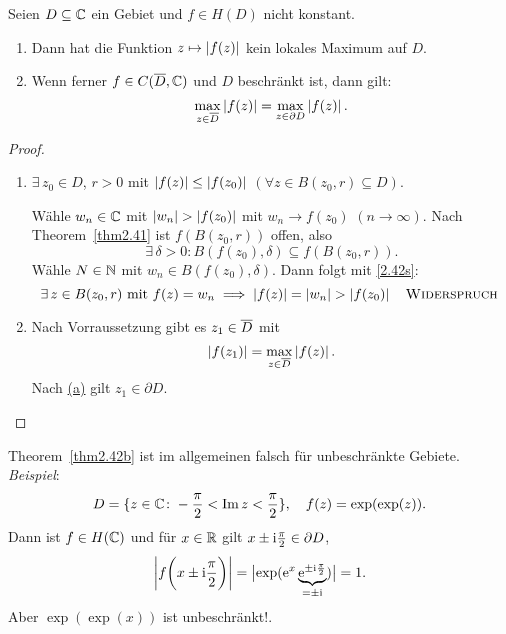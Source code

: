 \documentclass[a4paper,twoside,DIV15,BCOR12mm]{scrbook}
\begin{document}
\begin{thm}[Maximumsprinzip]\label{thm2.42}
Seien $D\subseteq\mathbb{C}$ ein Gebiet und $f\in H(D)$ nicht konstant.
\begin{enumerate}
\item\label{thm2.42a} Dann hat die Funktion $z\mapsto\left\lvert f(z)\right\lvert$ kein lokales Maximum auf $D$.
\item\label{thm2.42b} Wenn ferner $f\in C(\overline{D},\mathbb{C})$ und $D$ beschränkt ist, dann gilt:
\[\max_{z\in\overline{D}}\left\lvert f(z)\right\lvert=\max_{z\in\partial D}\left\lvert f(z)\right\lvert.\]
\end{enumerate}
\end{thm}

\begin{proof}\begin{enumerate}
\item \ann $\exists\, z_0\in D$, $r>0$ mit $\left\lvert f(z)\right\lvert\leq\left\lvert f(z_0)\right\lvert$ $(\forall z\in B(z_0,r)\subseteq D)$.

Wähle $w_n\in\mathbb{C}$ mit $\left\lvert w_n\right\lvert>\left\lvert f(z_0)\right\lvert$ mit $w_n\to f(z_0)$ $(n\to\infty)$. Nach Theorem~\ref{thm2.41} ist $f(B(z_0,r))$ offen, also
\[\label{2.42s}\exists\,\delta>0: B(f(z_0),\delta)\subseteq f(B(z_0,r)).\tag{$*$}\]
Wähle $N\in\mathbb{N}$ mit $w_n\in B(f(z_0),\delta)$. Dann folgt mit \eqref{2.42s}:
\[\exists\, z\in B(z_0,r)\text{ mit }f(z)=w_n\implies\left\lvert f(z)\right\lvert=\left\lvert w_n\right\lvert>\left\lvert f(z_0)\right\lvert\quad\text{\textsc{Widerspruch }}\]

\item Nach Vorraussetzung gibt es $z_1\in\overline{D}$ mit
\[\left\lvert f(z_1)\right\lvert = \max_{z\in\overline{D}}\left\lvert f(z)\right\lvert.\]
Nach \hyperref[thm2.42a]{(a)} gilt $z_1\in\partial D$.\qedhere
\end{enumerate}
\end{proof}

\begin{bem*} Theorem~\ref{thm2.42b} ist im allgemeinen falsch für unbeschränkte Gebiete. \textit{Beispiel}:
\[D=\{z\in\mathbb{C}\colon -\frac{\pi}{2}<\operatorname{Im}{z}<\frac{\pi}{2}\},\quad f(z)=\exp(\exp(z)).\]
Dann ist $f\in H(\mathbb{C})$ und für $x\in\mathbb{R}$ gilt $x\pm\mathrm{i}\frac{\pi}{2}\in\partial D$,
\[\left\lvert f\biggl(x\pm\mathrm{i}\frac{\pi}{2}\biggr)\right\lvert=\bigl\lvert\exp(\mathrm{e}^x\underbrace{\mathrm{e}^{\pm\mathrm{i}\frac{\pi}{2}}}_{=\pm\mathrm{i}})\bigr\rvert=1.\]
Aber $\exp(\exp(x))$ ist unbeschränkt!.
\end{bem*}
\end{document}

